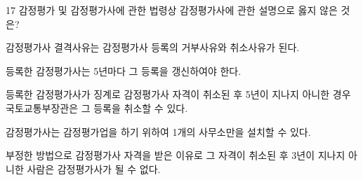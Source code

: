 \begin{question}{17}
감정평가 및 감정평가사에 관한 법령상 감정평가사에 관한 설명으로 옳지 않은 것은?
\begin{choices}
  \item 감정평가사 결격사유는 감정평가사 등록의 거부사유와 취소사유가 된다.
  \item 등록한 감정평가사는 5년마다 그 등록을 갱신하여야 한다.
  \item 등록한 감정평가사가 징계로 감정평가사 자격이 취소된 후 5년이 지나지 아니한 경우 국토교통부장관은 그 등록을 취소할 수 있다.
  \item 감정평가사는 감정평가업을 하기 위하여 1개의 사무소만을 설치할 수 있다.
  \item 부정한 방법으로 감정평가사 자격을 받은 이유로 그 자격이 취소된 후 3년이 지나지 아니한 사람은 감정평가사가 될 수 없다.
\end{choices}
\end{question}
